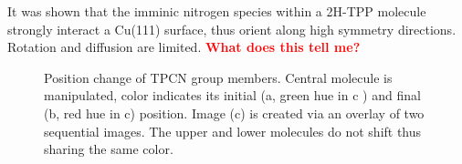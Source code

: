   It was shown that the imminic nitrogen species within a 2H-TPP molecule strongly interact a Cu(111) surface, thus orient along high symmetry directions.\cite{haq_clean_2011, buchner_diffusion_2011, gonzalez-moreno_following_2011, diller_self-metalation_2012, ditze_activation_2012,rojas_self-assembly_2010} 
  Rotation and diffusion are limited. \textcolor{red}{\textbf{What does this tell me?}}
  
  
  \begin{figure}[!h]
  	\centering
  	\caption{Position change of TPCN group members. Central molecule is manipulated, color indicates its initial (a, green hue in c ) and final (b, red hue in c) position. Image (c) is created via an overlay of two sequential images. The upper and lower molecules do not shift thus sharing the same color.}
  	\label{fig:TPCN-manipulation}
  \end{figure}
  
